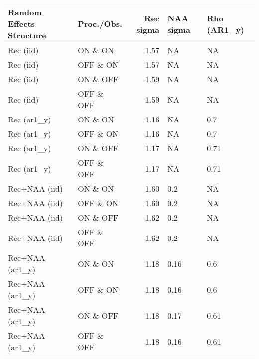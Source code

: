 \begin{table}[H]
    \centering
    \begin{tabular}{llrll}
        \toprule
         Random Effects Structure & Proc./Obs. & Rec sigma & NAA sigma & Rho (AR1\_y) \\
        \midrule
        Rec (iid)       & ON \& ON   & 1.57 & NA & NA \\
        Rec (iid)       & OFF \& ON  & 1.57 & NA & NA \\
        Rec (iid)       & ON \& OFF  & 1.59 & NA & NA \\
        Rec (iid)       & OFF \& OFF & 1.59 & NA & NA \\
        Rec (ar1\_y)    & ON \& ON   & 1.16 & NA & 0.7 \\
        Rec (ar1\_y)    & OFF \& ON  & 1.16 & NA & 0.7 \\
        Rec (ar1\_y)    & ON \& OFF  & 1.17 & NA & 0.71 \\
        Rec (ar1\_y)    & OFF \& OFF & 1.17 & NA & 0.71 \\
        Rec+NAA (iid)     & ON \& ON   & 1.60 & 0.2 & NA \\
        Rec+NAA (iid)     & OFF \& ON  & 1.60 & 0.2 & NA \\
        Rec+NAA (iid)     & ON \& OFF  & 1.62 & 0.2 & NA \\
        Rec+NAA (iid)     & OFF \& OFF & 1.62 & 0.2 & NA \\
        Rec+NAA (ar1\_y)  & ON \& ON   & 1.18 & 0.16 & 0.6 \\
        Rec+NAA (ar1\_y)  & OFF \& ON  & 1.18 & 0.16 & 0.6 \\
        Rec+NAA (ar1\_y)  & ON \& OFF  & 1.18 & 0.17 & 0.61 \\
        Rec+NAA (ar1\_y)  & OFF \& OFF & 1.18 & 0.16 & 0.61 \\
        \bottomrule
    \end{tabular}
\end{table}
